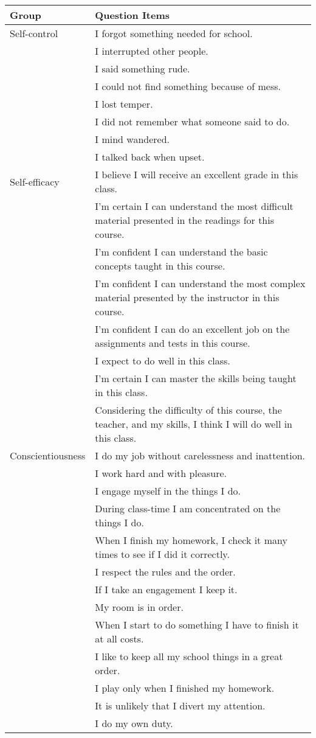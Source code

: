 \begin{tabular}{ll}
\hline \hline 
Group & Question Items \\
\hline 
Self-control & I forgot something needed for school. \\
 & I interrupted other people. \\
 & I said something rude. \\
 & I could not find something because of mess. \\
 & I lost temper. \\
 & I did not remember what someone said to do. \\
 & I mind wandered. \\
 & I talked back when upset. \\
Self-efficacy & I believe I will receive an excellent grade in this class. \\
 & I'm certain I can understand the most difficult material presented in the readings for this course. \\
 & I'm confident I can understand the basic concepts taught in this course. \\
 & I'm confident I can understand the most complex material presented by the instructor in this course. \\
 & I'm confident I can do an excellent job on the assignments and tests in this course. \\
 & I expect to do well in this class. \\
 & I'm certain I can master the skills being taught in this class. \\
 & Considering the difficulty of this course, the teacher, and my skills, I think I will do well in this class. \\
Conscientiousness & I do my job without carelessness and inattention. \\
 & I work hard and with pleasure. \\
 & I engage myself in the things I do. \\
 & During class-time I am concentrated on the things I do. \\
 & When I finish my homework, I check it many times to see if I did it correctly. \\
 & I respect the rules and the order. \\
 & If I take an engagement I keep it. \\
 & My room is in order. \\
 & When I start to do something I have to finish it at all costs. \\
 & I like to keep all my school things in a great order. \\
 & I play only when I finished my homework. \\
 & It is unlikely that I divert my attention. \\
 & I do my own duty. \\
\hline \hline
\end{tabular}